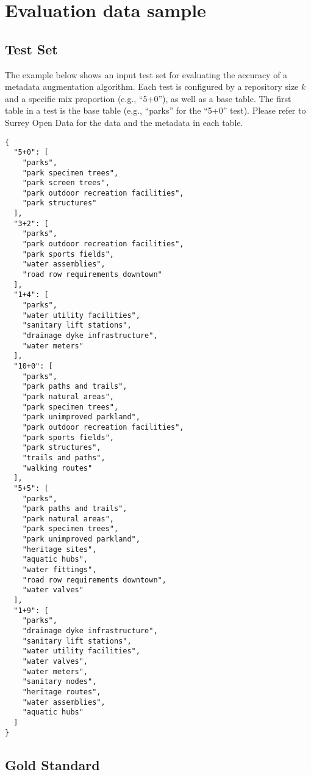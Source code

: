 \chapter{Evaluation data sample}

\section{Test Set}
\label{sec:TestSet}

The example below shows an input test set for evaluating the accuracy of a metadata augmentation algorithm. Each test is configured by a repository size $k$ and a specific mix proportion (e.g., “5+0”), as well as a base table. The first table in a test is the base table (e.g., “parks” for the “5+0” test). Please refer to Surrey Open Data for the data and the metadata in each table.

\begin{lstlisting}
{
  "5+0": [
    "parks",
    "park specimen trees",
    "park screen trees",
    "park outdoor recreation facilities",
    "park structures"
  ],
  "3+2": [
    "parks",
    "park outdoor recreation facilities",
    "park sports fields",
    "water assemblies",
    "road row requirements downtown"
  ],
  "1+4": [
    "parks",
    "water utility facilities",
    "sanitary lift stations",
    "drainage dyke infrastructure",
    "water meters"
  ],
  "10+0": [
    "parks",
    "park paths and trails",
    "park natural areas",
    "park specimen trees",
    "park unimproved parkland",
    "park outdoor recreation facilities",
    "park sports fields",
    "park structures",
    "trails and paths",
    "walking routes"
  ],
  "5+5": [
    "parks",
    "park paths and trails",
    "park natural areas",
    "park specimen trees",
    "park unimproved parkland",
    "heritage sites",
    "aquatic hubs",
    "water fittings",
    "road row requirements downtown",
    "water valves"
  ],
  "1+9": [
    "parks",
    "drainage dyke infrastructure",
    "sanitary lift stations",
    "water utility facilities",
    "water valves",
    "water meters",
    "sanitary nodes",
    "heritage routes",
    "water assemblies",
    "aquatic hubs"
  ]
}
\end{lstlisting}

\section{Gold Standard}
\label{sec:Gold Standard}

